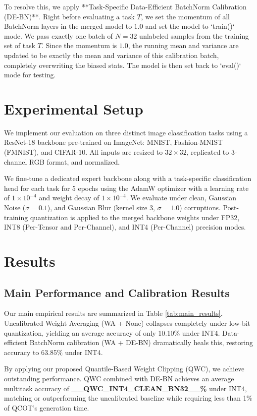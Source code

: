\documentclass{article}
\theoremstyle{plain}
\theoremstyle{definition}
\theoremstyle{remark}
\begin{document}
To resolve this, we apply **Task-Specific Data-Efficient BatchNorm Calibration (DE-BN)**. Right before evaluating a task $T$, we set the momentum of all BatchNorm layers in the merged model to $1.0$ and set the model to `train()` mode. We pass exactly one batch of $N = 32$ unlabeled samples from the training set of task $T$. Since the momentum is $1.0$, the running mean and variance are updated to be exactly the mean and variance of this calibration batch, completely overwriting the biased stats. The model is then set back to `eval()` mode for testing.

\section{Experimental Setup}
We implement our evaluation on three distinct image classification tasks using a ResNet-18 backbone pre-trained on ImageNet: MNIST, Fashion-MNIST (FMNIST), and CIFAR-10. All inputs are resized to $32 \times 32$, replicated to 3-channel RGB format, and normalized. 

We fine-tune a dedicated expert backbone along with a task-specific classification head for each task for 5 epochs using the AdamW optimizer with a learning rate of $1 \times 10^{-4}$ and weight decay of $1 \times 10^{-4}$. We evaluate under clean, Gaussian Noise ($\sigma = 0.1$), and Gaussian Blur (kernel size 3, $\sigma = 1.0$) corruptions. Post-training quantization is applied to the merged backbone weights under FP32, INT8 (Per-Tensor and Per-Channel), and INT4 (Per-Channel) precision modes.

\section{Results}
\subsection{Main Performance and Calibration Results}
Our main empirical results are summarized in Table \ref{tab:main_results}.
Uncalibrated Weight Averaging (WA + None) collapses completely under low-bit quantization, yielding an average accuracy of only 10.10\% under INT4. Data-efficient BatchNorm calibration (WA + DE-BN) dramatically heals this, restoring accuracy to 63.85\% under INT4.

By applying our proposed Quantile-Based Weight Clipping (QWC), we achieve outstanding performance. QWC combined with DE-BN achieves an average multitask accuracy of \textbf{__QWC_INT4_CLEAN_BN32__\%} under INT4, matching or outperforming the uncalibrated baseline while requiring less than 1\% of QCOT's generation time.
\end{document}
